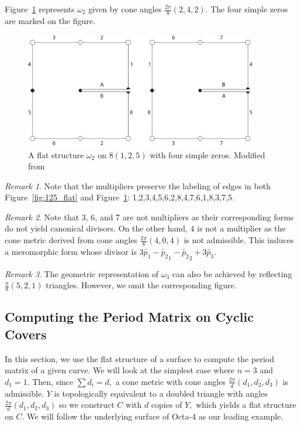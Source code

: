 \documentclass[12pt,reqno]{amsart}
\theoremstyle{definition}
\theoremstyle{remark}
\newtheorem*{remark}{Remark}
\begin{document}
Figure~\ref{fig:flat_rs2} represents $\omega_2$ given by cone angles $\frac{2 \pi}{8}(2, 4, 2).$ The four simple zeros are marked on the figure.

\begin{figure}[htbp]
   \centering
   \includegraphics[width=4in]{figures/flat_rs2.pdf} 
  \caption{A flat structure $\omega_2$ on $8(1, 2, 5)$ with four simple zeros. Modified from \cite{dthesis}}
  \label{fig:flat_rs2}
\end{figure}

\begin{remark} Note that the multipliers preserve the labeling of edges in both Figure~\ref{fig:125_flat} and Figure~\ref{fig:flat_rs2}: 1,2,3,4,5,6,2,8,4,7,6,1,8,3,7,5.
\end{remark}

\begin{remark} Note that 3, 6, and 7 are not multipliers as their corresponding forms do not yield canonical divisors. On the other hand, 4 is not a multiplier as the cone metric derived from cone angles $\frac{2 \pi}{8} (4, 0, 4)$ is not admissible. This induces a meromorphic form whose divisor is $3 \widetilde{p_1} - \widetilde{p_2}_1 - \widetilde{p_2}_2 + 3 \widetilde{p_3}.$ \end{remark}

\begin{remark} The geometric representation of $\omega_3$ can also be achieved by reflecting $\frac{\pi}{8}(5, 2, 1)$ triangles. However, we omit the corresponding figure. \end{remark}



\subsection{Computing the Period Matrix on Cyclic Covers}
\label{sec:cyclicperiod}
In this section, we use the flat structure of a surface to compute the period matrix of a given curve. We will look at the simplest case where $n = 3$ and $d_1 = 1.$ Then, since $\sum d_i = d,$ a cone metric with cone angles $\frac{2 \pi}{d}(d_1, d_2, d_3)$ is admissible. $Y$ is topologically equivalent to a doubled triangle with angles $\frac{2 \pi}{d}(d_1, d_2, d_3)$ so we construct $C$ with $d$ copies of $Y,$ which yields a flat structure on $C.$  We will follow the underlying surface of Octa-4 as our leading example.
\end{document}
